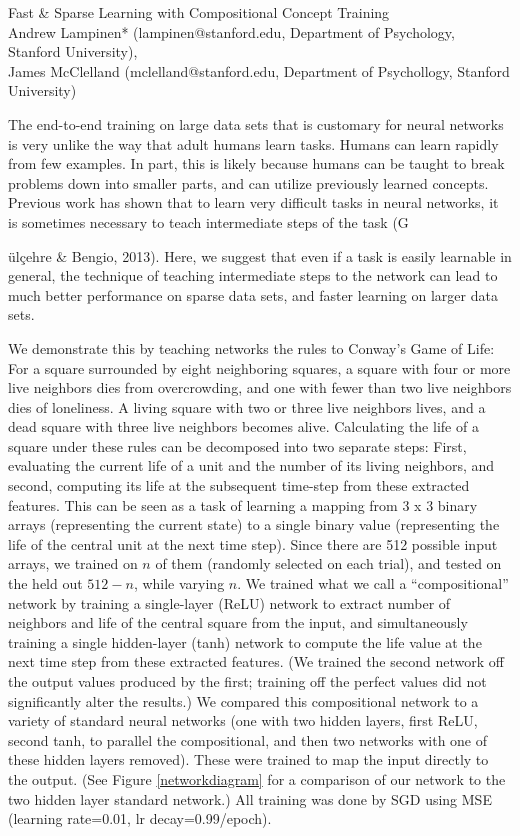 \documentclass[10pt]{article}
\begin{document}
\begingroup  
  \centering
  \large Fast \& Sparse Learning with Compositional Concept Training\\[1em]
  \small{Andrew Lampinen* (lampinen@stanford.edu, Department of Psychology, Stanford University),\\ James McClelland (mclelland@stanford.edu, Department of Psychollogy, Stanford University)}\par
\endgroup
\vspace{10pt}
The end-to-end training on large data sets that is customary for neural networks is very unlike the way that adult humans learn tasks. Humans can learn rapidly from few examples. In part, this is likely because humans can be taught to break problems down into smaller parts, and can utilize previously learned concepts. Previous work has shown that to learn very difficult tasks in neural networks, it is sometimes necessary to teach intermediate steps of the task (G{\"{u}l\c{c}ehre \& Bengio, 2013). Here, we suggest that even if a task is easily learnable in general, the technique of teaching intermediate steps to the network can lead to much better performance on sparse data sets, and faster learning on larger data sets.\par
We demonstrate this by teaching networks the rules to Conway's Game of Life: For a square surrounded by eight neighboring squares, a square with four or more live neighbors dies from overcrowding, and one with fewer than two live neighbors dies of loneliness. A living square with two or three live neighbors lives, and a dead square with three live neighbors becomes alive. Calculating the life of a square under these rules can be decomposed into two separate steps: First, evaluating the current life of a unit and the number of its living neighbors, and second, computing its life at the subsequent time-step from these extracted features. This can be seen as a task of learning a mapping from 3 x 3 binary arrays (representing the current state) to a single binary value (representing the life of the central unit at the next time step). Since there are 512 possible input arrays, we trained on $n$ of them (randomly selected on each trial), and tested on the held out $512-n$, while varying $n$. We trained what we call a ``compositional'' network by training a single-layer (ReLU) network to extract number of neighbors and life of the central square from the input, and simultaneously training a single hidden-layer (tanh) network to compute the life value at the next time step from these extracted features. (We trained the second network off the output values produced by the first; training off the perfect values did not significantly alter the results.) We compared this compositional network to a variety of standard neural networks (one with two hidden layers, first ReLU, second tanh, to parallel the compositional, and then two networks with one of these hidden layers removed). These were trained to map the input directly to the output. (See Figure \ref{networkdiagram} for a comparison of our network to the two hidden layer standard network.) All training was done by SGD using MSE (learning rate=0.01, lr decay=0.99/epoch).\par
}
\end{document}
